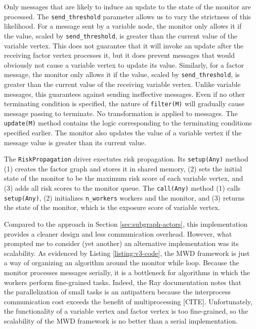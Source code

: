 \par Only messages that are likely to induce an update to the state of the monitor are processed. The \texttt{send\_threshold} parameter allows us to vary the strictness of this likelihood. For a message sent by a variable node, the monitor only allows it if the value, scaled by \texttt{send\_threshold}, is greater than the current value of the variable vertex. This does not guarantee that it will invoke an update after the receiving factor vertex processes it, but it does prevent messages that would obviously not cause a variable vertex to update its value. Similarly, for a factor message, the monitor only allows it if the value, scaled by \texttt{send\_threshold}, is greater than the current value of the receiving variable vertex. Unlike variable messages, this guarantees against sending ineffective messages. Even if no other terminating condition is specified, the nature of \texttt{filter(M)} will gradually cause message passing to terminate. No transformation is applied to messages. The \texttt{update(M)} method contains the logic corresponding to the terminating conditions specified earlier. The monitor also updates the value of a variable vertex if the message value is greater than its current value.

\par The \texttt{RiskPropagation} driver exectutes risk propagation. Its \texttt{setup(Any)} method (1) creates the factor graph and stores it in shared memory, (2) sets the initial state of the monitor to be the maximum risk score of each variable vertex, and (3) adds all risk scores to the monitor queue. The \texttt{call(Any)} method (1) calls \texttt{setup(Any)}, (2) initializes \texttt{n\_workers} workers and the monitor, and (3) returns the state of the monitor, which is the exposure score of variable vertex.

\par Compared to the approach in Section \ref{sec:subgraph-actors}, this implementation provides a cleaner design and less communication overhead. However, what prompted me to consider (yet another) an alternative implementation was its scalability. As evidenced by Listing \ref{listing:v3-code}, the MWD framework is just a way of organizing an algorithm around the monitor while loop. Because the monitor processes messages serially, it is a bottleneck for algorithms in which the workers perform fine-grained tasks. Indeed, the Ray documentation notes that the parallelization of small tasks is an antipattern because the interprocess communication cost exceeds the benefit of multiprocessing [CITE]. Unfortunately, the functionality of a variable vertex and factor vertex is too fine-grained, so the scalability of the MWD framework is no better than a serial implementation.

